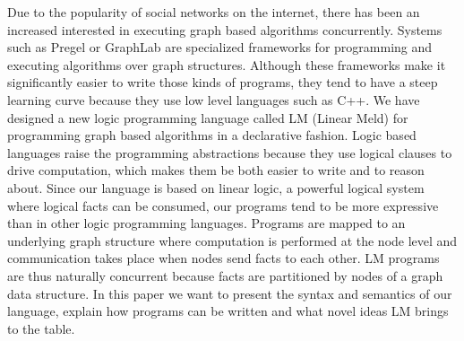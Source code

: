 Due to the popularity of social networks on the internet, there has
been an increased interested in executing graph based algorithms
concurrently. Systems such as Pregel or GraphLab are specialized
frameworks for programming and executing algorithms over graph
structures. Although these frameworks make it significantly easier to
write those kinds of programs, they tend to have a steep learning
curve because they use low level languages such as C++. We have
designed a new logic programming language called LM (Linear Meld) for
programming graph based algorithms in a declarative fashion. Logic
based languages raise the programming abstractions because they use
logical clauses to drive computation, which makes them be both easier
to write and to reason about. Since our language is based on linear
logic, a powerful logical system where logical facts can be consumed,
our programs tend to be more expressive than in other logic
programming languages. Programs are mapped to an underlying graph
structure where computation is performed at the node level and
communication takes place when nodes send facts to each other.  LM
programs are thus naturally concurrent because facts are partitioned
by nodes of a graph data structure. In this paper we want to
present the syntax and semantics of our language, explain how programs
can be written and what novel ideas LM brings to the table.
